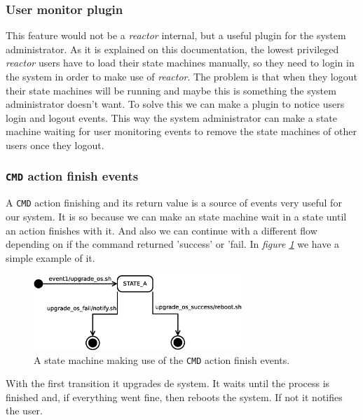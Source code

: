 \subsubsection{User monitor plugin}
This feature would not be a \emph{reactor} internal, but a useful plugin for the system administrator. As it is explained on this 
documentation, the lowest privileged \emph{reactor} users have to load their state machines manually, so they need to login in the system 
in order to make use of \emph{reactor}. The problem is that when they logout their state machines will be running and maybe this is 
something the system administrator doesn't want. To solve this we can make a plugin to notice users login and logout events.
This way the system
administrator can make a state machine waiting for user monitoring events to remove the state machines of other users once they logout.
\subsubsection{\texttt{CMD} action finish events}
A \texttt{CMD} action finishing and its return value is a source of events very useful for our system. It is so because we can make
an state machine wait in a state until an action finishes with it. And also we can continue with a different flow depending on if the
command returned 'success' or 'fail. In \emph{figure \ref{fig:actionevents}} we have a simple example of it.
\begin{figure}[h]
  \centering
  \includegraphics[width=0.7\textwidth,keepaspectratio]{img/actionevents}
  \caption{A state machine making use of the \texttt{CMD} action finish events.}
  \label{fig:actionevents}
\end{figure}
With the first transition it upgrades de system. It waits until the process is finished and, if everything went fine, then reboots the 
system. If not it notifies the user.
